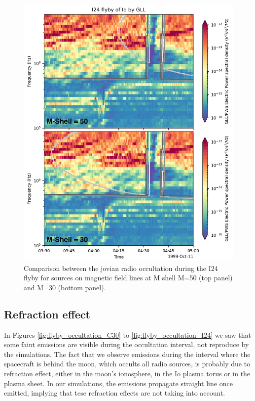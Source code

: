 \documentclass[referee]{aa}
\begin{document}
\begin{figure}
    \centering
    \includegraphics[width=\textwidth]{Moon_flyby_galileo_occultation_data_simu_I24_mshell30-50-compa.pdf}
    \caption{Comparison between the jovian radio occultation during the I24 flyby for sources on magnetic field lines at M shell M=50 (top panel) and M=30 (bottom panel).}
    \label{fig:compa_mshell_50_30}
\end{figure}

\subsection{Refraction effect}
 In Figures \ref{fig:flyby_occultation_C30} to \ref{fig:flyby_occultation_I24} we saw that some faint emissions are visible during the occultation interval, not reproduce by the simulations. The fact that we observe emissions during the interval where the spacecraft is behind the moon, which occults all radio sources, is probably due to refraction effect, either in the moon's ionosphere, in the Io plasma torus or in the plasma sheet. In our simulations, the emissions propagate straight line once emitted, implying that tese refraction effects are not taking into account.
  
\end{document}
